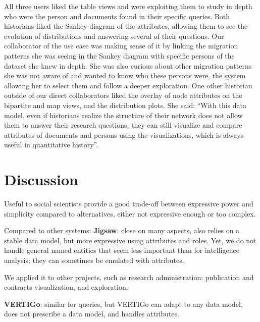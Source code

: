 All three users liked the table views and were exploiting them to study in depth who were the person and documents found in their specific queries.
Both historians liked the Sankey diagram of the attributes, allowing them to see the evolution of distributions and answering several of their questions.
Our collaborator of the use case \nicole was making sense of it by linking the migration patterns she was seeing in the Sankey diagram with specific persons of the dataset she knew in depth.
She was also curious about other migration patterns she was not aware of and wanted to know who these persons were, the system allowing her to select them and follow a deeper exploration.
One other historian outside of our direct collaborators liked the overlay of node attributes on the bipartite and map views, and the distribution plots. She said: ``With this data model, even if historians realize the structure of their network does not allow them to answer their research questions, they can still visualize and compare attributes of documents and persons using the visualizations, which is always useful in quantitative history''.




\iffalse
\section{Discussion}

Useful to social scientists provide a good trade-off between expressive power and simplicity compared to alternatives, either not expressive enough or too complex.

Compared to other systems:
\textbf{Jigsaw}: close on many aspects, also relies on a stable data model, but more expressive using attributes and roles. Yet, we do not handle general named entities that seem less important than for intelligence analysis; they can sometimes be emulated with attributes.

We applied it to other projects, such as research administration: publication and contracts visualization, and exploration.


\textbf{VERTIGo}: similar for queries, but VERTIGo can adapt to any data model, does not prescribe a data model, and handles attributes.

